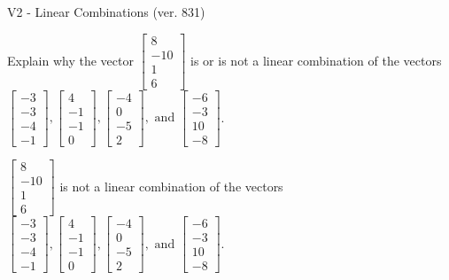 \begin{exercise}
  \begin{exerciseTitle}V2 - Linear Combinations (ver. 831)\end{exerciseTitle}
  \begin{exerciseStatement}
    Explain why the vector \(\left[\begin{array}{c}
8 \\
-10 \\
1 \\
6
\end{array}\right]\)  is or is not a linear 
	combination of the vectors \(\left[\begin{array}{c}
-3 \\
-3 \\
-4 \\
-1
\end{array}\right] , \left[\begin{array}{c}
4 \\
-1 \\
-1 \\
0
\end{array}\right] , \left[\begin{array}{c}
-4 \\
0 \\
-5 \\
2
\end{array}\right] , \text{ and } \left[\begin{array}{c}
-6 \\
-3 \\
10 \\
-8
\end{array}\right]\).
	


  \end{exerciseStatement}
  \begin{exerciseAnswer}
   \(\left[\begin{array}{c}
8 \\
-10 \\
1 \\
6
\end{array}\right]\) 
  	 is not  
	a linear combination of the vectors \(\left[\begin{array}{c}
-3 \\
-3 \\
-4 \\
-1
\end{array}\right] , \left[\begin{array}{c}
4 \\
-1 \\
-1 \\
0
\end{array}\right] , \left[\begin{array}{c}
-4 \\
0 \\
-5 \\
2
\end{array}\right] , \text{ and } \left[\begin{array}{c}
-6 \\
-3 \\
10 \\
-8
\end{array}\right]\).


\end{exerciseAnswer}
\end{exercise}
